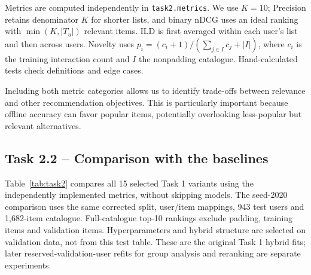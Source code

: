 \documentclass[12pt,a4paper]{article}   %
\begin{document}
Metrics are computed independently in \texttt{task2.metrics}.
We use $K=10$; Precision retains denominator $K$ for shorter
lists, and binary nDCG uses an ideal ranking with
$\min(K,|T_u|)$ relevant items. ILD is first averaged within
each user's list and then across users. Novelty uses
$p_i=(c_i+1)/(\sum_{j\in I}c_j+|I|)$, where $c_i$ is the
training interaction count and $I$ the nonpadding catalogue.
Hand-calculated tests check definitions and edge cases.

Including both metric categories allows us to identify
trade-offs between relevance and other recommendation
objectives. This is particularly important because offline
accuracy can favor popular items, potentially overlooking
less-popular but relevant alternatives.

\clearpage
\subsection{Task 2.2 -- Comparison with the baselines}

Table~\ref{tab:task2} compares all 15 selected Task 1 variants using the independently implemented metrics, without skipping models. The seed-2020 comparison uses the same corrected split, user/item mappings, 943 test users and 1,682-item catalogue. Full-catalogue top-10 rankings exclude padding, training items and validation items. Hyperparameters and hybrid structure are selected on validation data, not from this test table. These are the original Task 1 hybrid fits; later reserved-validation-user refits for group analysis and reranking are separate experiments.
\end{document}
